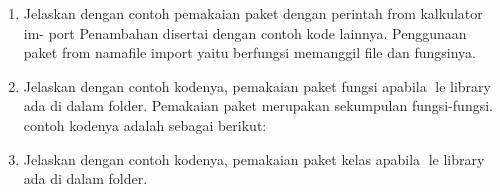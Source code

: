 \begin{enumerate}
\begin{itemize}
    \end{itemize}
    

    \item Jelaskan dengan contoh pemakaian paket dengan perintah from kalkulator im-
    port Penambahan disertai dengan contoh kode lainnya.
    Penggunaan paket from namafile import yaitu berfungsi memanggil file dan fungsinya.
    

    \item Jelaskan dengan contoh kodenya, pemakaian paket fungsi apabila le library
    ada di dalam folder.
    Pemakaian paket merupakan sekumpulan fungsi-fungsi. contoh kodenya adalah sebagai berikut:

    \item Jelaskan dengan contoh kodenya, pemakaian paket kelas apabila le library ada
    di dalam folder.
    

\end{enumerate}
